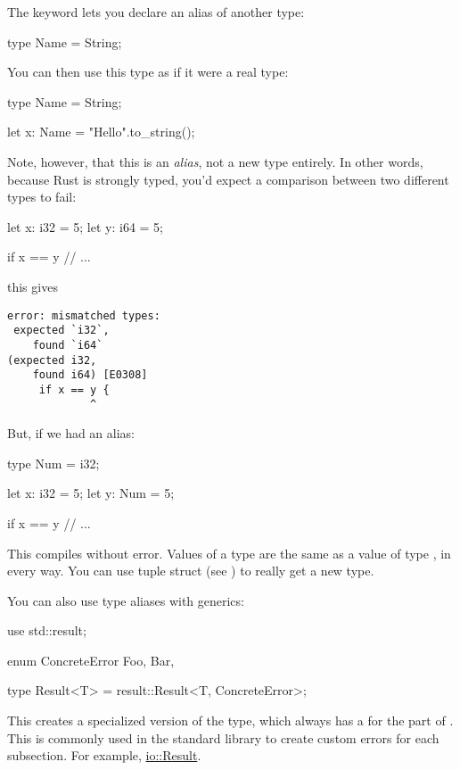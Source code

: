 The  keyword lets you declare an alias of another type:

\begin{rustc}
type Name = String;
\end{rustc}

You can then use this type as if it were a real type:

\begin{rustc}
type Name = String;

let x: Name = "Hello".to_string();
\end{rustc}

Note, however, that this is an \emph{alias}, not a new type entirely. In other words, because Rust is strongly typed, you'd expect 
a comparison between two different types to fail:

\begin{rustc}
let x: i32 = 5;
let y: i64 = 5;

if x == y {
   // ...
}
\end{rustc}

this gives

\begin{verbatim}
error: mismatched types:
 expected `i32`,
    found `i64`
(expected i32,
    found i64) [E0308]
     if x == y {
             ^
\end{verbatim}

But, if we had an alias:

\begin{rustc}
type Num = i32;

let x: i32 = 5;
let y: Num = 5;

if x == y {
   // ...
}
\end{rustc}

This compiles without error. Values of a  type are the same as a value of type \itt, in every way. You can use 
tuple struct (see ) to really get a new type.

\blank

You can also use type aliases with generics:

\begin{rustc}
use std::result;

enum ConcreteError {
    Foo,
    Bar,
}

type Result<T> = result::Result<T, ConcreteError>;
\end{rustc}

This creates a specialized version of the  type, which always has a  for the  part of 
. This is commonly used in the standard library to create custom errors for each subsection. For example, 
\href{https://doc.rust-lang.org/std/io/type.Result.html}{io::Result}.
